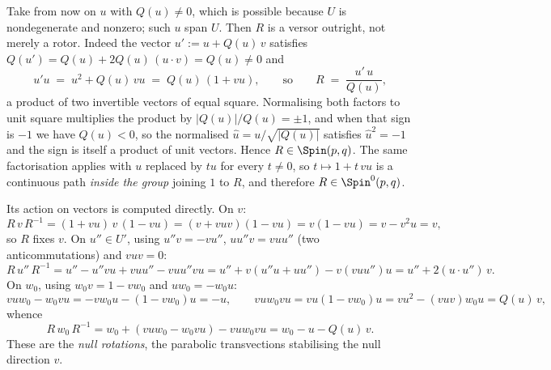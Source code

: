Take from now on $u$ with $Q(u) \neq 0$, which is possible because $U$ is nondegenerate and nonzero; such $u$ span $U$. Then $R$ is a versor outright, not merely a rotor. Indeed the vector $u' \mathrel{:=} u + Q(u)\,v$ satisfies $Q(u') = Q(u) + 2Q(u)\,(u \cdot v) = Q(u) \neq 0$ and
\begin{equation}\label{eq:versorfactor}
u'u \;=\; u^2 + Q(u)\,vu \;=\; Q(u)\,(1 + vu), \qquad \text{so} \qquad R \;=\; \frac{u'\,u}{Q(u)},
\end{equation}
a product of two invertible vectors of equal square. Normalising both factors to unit square multiplies the product by $|Q(u)|/Q(u) = \pm 1$, and when that sign is $-1$ we have $Q(u) < 0$, so the normalised $\hat{u} = u/\sqrt{|Q(u)|}$ satisfies $\hat{u}^2 = -1$ and the sign is itself a product of unit vectors. Hence $R \in \Spin(p,q)$. The same factorisation applies with $u$ replaced by $tu$ for every $t \neq 0$, so $t \mapsto 1 + t\,vu$ is a continuous path \emph{inside the group} joining $1$ to $R$, and therefore $R \in \Spin^0(p,q)$.

Its action on vectors is computed directly. On $v$:
\[
R\,v\,R^{-1} = (1 + vu)\,v\,(1 - vu) = (v + vuv)(1 - vu) = v(1 - vu) = v - v^2u = v ,
\]
so $R$ fixes $v$. On $u'' \in U'$, using $u''v = -vu''$, $u u'' v = v u u''$ (two anticommutations) and $vuv = 0$:
\[
R\,u''\,R^{-1} = u'' - u''vu + vuu'' - vuu''vu = u'' + v(u''u + uu'') - v(vuu'')u = u'' + 2(u \cdot u'')\,v .
\]
On $w_0$, using $w_0 v = 1 - v w_0$ and $u w_0 = -w_0 u$:
\[
vuw_0 - w_0vu = -vw_0u - (1 - vw_0)u = -u, \qquad
vuw_0vu = vu(1 - vw_0)u = vu^2 - (vuv)w_0u = Q(u)\,v,
\]
whence
\[
R\,w_0\,R^{-1} = w_0 + (vuw_0 - w_0vu) - vuw_0vu = w_0 - u - Q(u)\,v .
\]
These are the \emph{null rotations}, the parabolic transvections stabilising the null direction $v$.

